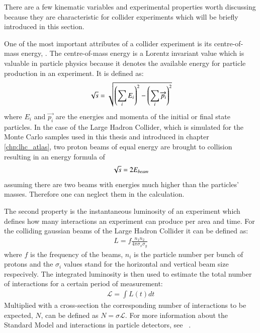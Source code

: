 There are a few kinematic variables and experimental properties worth discussing because they are characteristic for collider experiments which will be briefly introduced in this section.

One of the most important attributes of a collider experiment is its centre-of-mass energy, \Ecms. The centre-of-mass energy is a Lorentz invariant value which is valuable in particle physics because it denotes the available energy for particle production in an experiment.
It is defined as:
%
\begin{align}
\sqrt{s} = \sqrt{ \left( \sum_i E_i \right)^2 - \left( \sum_i \overrightarrow{p_i} \right)^2 }
\end{align}
%
where $E_i$ and $\overrightarrow{p_i}$ are the energies and momenta of the initial or final state particles.
In the case of the Large Hadron Collider, which is simulated for the Monte Carlo samples used in this thesis and introduced in chapter \ref{chp:lhc_atlas}, two proton beams of equal energy are brought to collision resulting in an energy formula of
%
\begin{align}
\sqrt{s} = 2 E_{beam}
\end{align}
%
assuming there are two beams with energies much higher than the particles' masses. Therefore one can neglect them in the calculation.

The second property is the instantaneous luminosity of an experiment which defines how many interactions an experiment can produce per area and time. For the colliding gaussian beams of the Large Hadron Collider it can be defined as:
%
\begin{align}
L =f \frac{n_1 n_2}{4 \pi \sigma_x \sigma_y}
\end{align}
%
where $f$ is the frequency of the beams, $n_i$ is the particle number per bunch of protons and the $\sigma_i$ values stand for the horizontal and vertical beam size respecively.
The integrated luminosity is then used to estimate the total number of interactions for a certain period of measurement:
%
\begin{align}
\mathcal{L} = \int L(t) dt
\end{align}
%
Multiplied with a cross-section the corresponding number of interactions to be expected, $N$, can be defined as $N = \sigma \mathcal{L}$.
For more information about the Standard Model and interactions in particle detectors, see ~\cite{thomson, griffiths}.

